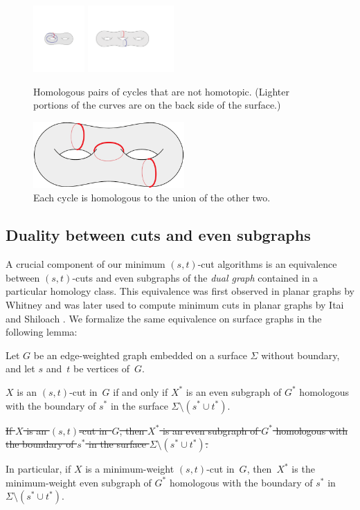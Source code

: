 \documentclass[letterpaper,review]{siamart190516}
\def\Cut{X}
\def\modified#1{\color{blue}#1 \color{black}}
\begin{document}
\begin{figure}[htb]
\centering
\includegraphics[height=1in]{Fig/homologous3}\qquad
\includegraphics[height=1in]{Fig/homologous2}
\caption{Homologous pairs of cycles that are not homotopic.  (Lighter portions of the curves are on the back side of the surface.)}
\label{fig:homology}
\end{figure}

\begin{figure}[htb]
\centering
\includegraphics[height=1in]{Fig/homologous1}
\caption{Each cycle is homologous to the union of the other two.}
\label{fig:homology2}
\end{figure}


\subsection{Duality between cuts and even subgraphs}
\label{SS:duality}


A crucial component of our minimum $(s,t)$-cut algorithms is an equivalence between $(s,t)$-cuts and even subgraphs of the \emph{dual graph} contained in a particular homology class.  This equivalence was first observed in planar graphs by Whitney \cite{w-pg-33} and was later used to compute minimum cuts in planar graphs by Itai and Shiloach \cite{is-mfpn-79}.
We formalize the same equivalence on surface graphs in the following lemma:

\begin{lemma}
\label{lem:cut-duality}
Let $G$ be an edge-weighted graph embedded on a surface $\Sigma$ without boundary, and let $s$ and~$t$ be vertices of~$G$.  

\modified{$\Cut$ is an $(s,t)$-cut in~$G$ if and only if $\Cut^*$ is an even subgraph of $G^*$ homologous with the boundary of $s^*$ in the surface $\Sigma\setminus(s^*\cup t^*)$. }

\sout{If $\Cut$ is an $(s,t)$-cut in~$G$, then $\Cut^*$ is an even subgraph of $G^*$ homologous with the boundary of $s^*$ in the surface $\Sigma\setminus(s^*\cup t^*)$. }

In particular, if $X$ is a minimum-weight $(s,t)$-cut in~$G$, then~$\Cut^*$ is the minimum-weight even subgraph of $G^*$ homologous with the boundary of $s^*$ in $\Sigma\setminus(s^*\cup t^*)$.
\end{lemma}
\end{document}
